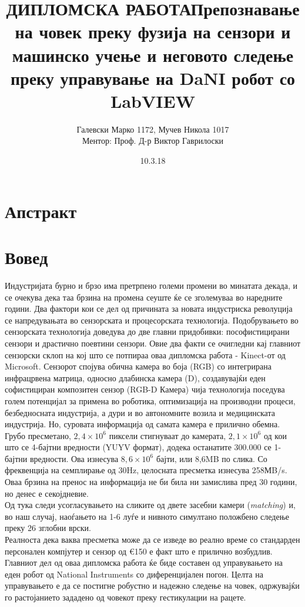 \documentclass[12pt]{article}
\title{ДИПЛОМСКА РАБОТА\bigbreak \textbf{Препознавање на човек преку фузија на сензори и машинско учење и неговото следење преку управување на DaNI робот со LabVIEW}}
\date{10.3.18}
\author{Галевски Марко 1172, Мучев Никола 1017	\\	Ментор: Проф. Д-р Виктор Гаврилоски}
\begin{document}
    \sloppy
    \maketitle{}
    \newpage
    \tableofcontents
    \newpage

\section{Апстракт}
\section{Вовед}
  Индустријата бурно и брзо има претрпено големи промени во минатата декада, и се очекува дека таа брзина на промена сеуште ќе се зголемуваа во наредните години. Два фактори кои се дел од причината за новата индустриска револуција се напредувањата во сензорската и процесорската технологија.\bigbreak
  Подобрувањето во сензорската технологија доведува до две главни придобивки: пософистицирани сензори и драстично поевтини сензори. Овие два факти се очигледни кај главниот сензорски склоп на кој што се потпираа оваа дипломска работа - Kinect-от од Microsoft. Сензорот спојува обична камера во боја (RGB) со интегрирана инфрацрвена матрица, односно длабинска камера (D), создавувајќи еден софистициран композитен сензор (RGB-D Камера) чија технологија поседува голем потенцијал за примена во роботика, оптимизација на производни процеси, безбедносната индустрија, а дури и во автономните возила и медицинската индустрија.
  \bigbreak
  Но, суровата информација од самата камера е прилично обемна. Грубо пресметано, $2,4 \times 10^6$ пиксели стигнуваат до камерата, $2,1 \times 10^6$ од кои што се 4-бајтни вредности (YUYV формат), додека останатите 300.000 се 1-бајтни вредности. Ова изнесува $8,6 \times 10^6$ бајти, или 8,6MB по слика. Со фреквенција на семплирање од 30Hz, целосната пресметка изнесува 258МB/s. Оваа брзина на пренос на информација не би била ни замислива пред 30 години, но денес е секојдневие.
  \\
  Од тука следи усогласувањето на сликите од двете засебни камери (\textit{matching}) и, во наш случај, наоѓањето на 1-6 луѓе и нивното симултано положбено следење преку 26 зглобни врски.
  \\
  Реалноста дека ваква пресметка може да се изведе во реално време со стандарден персонален компјутер и сензор од €150 е факт што е прилично возбудлив.
  \bigbreak
  Главниот дел од оваа дипломска работа ќе биде составен од управувањето на еден робот од National Instruments со диференцијален погон. Целта на управувањето е да се постигне робустно и надежно следење на човек, одржувајќи го растојанието зададено од човекот преку гестикулации на рацете.
  \\
\end{document}
